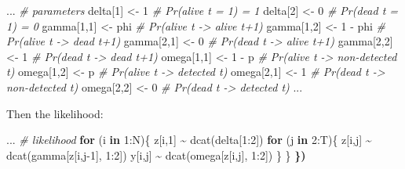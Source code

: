 \documentclass[
  12pt,
]{krantz}
\newenvironment{Shaded}{\begin{snugshade}}{\end{snugshade}}
\newcommand{\CommentTok}[1]{\textcolor[rgb]{0.56,0.35,0.01}{\textit{#1}}}
\newcommand{\ControlFlowTok}[1]{\textcolor[rgb]{0.13,0.29,0.53}{\textbf{#1}}}
\newcommand{\DecValTok}[1]{\textcolor[rgb]{0.00,0.00,0.81}{#1}}
\newcommand{\ErrorTok}[1]{\textcolor[rgb]{0.64,0.00,0.00}{\textbf{#1}}}
\newcommand{\FunctionTok}[1]{\textcolor[rgb]{0.00,0.00,0.00}{#1}}
\newcommand{\NormalTok}[1]{#1}
\newcommand{\OtherTok}[1]{\textcolor[rgb]{0.56,0.35,0.01}{#1}}
\newcommand{\SpecialCharTok}[1]{\textcolor[rgb]{0.00,0.00,0.00}{#1}}
\begin{document}
\begin{Shaded}
\begin{Highlighting}[]
\NormalTok{...}
  \CommentTok{\# parameters}
\NormalTok{  delta[}\DecValTok{1}\NormalTok{] }\OtherTok{\textless{}{-}} \DecValTok{1}          \CommentTok{\# Pr(alive t = 1) = 1}
\NormalTok{  delta[}\DecValTok{2}\NormalTok{] }\OtherTok{\textless{}{-}} \DecValTok{0}          \CommentTok{\# Pr(dead t = 1) = 0}
\NormalTok{  gamma[}\DecValTok{1}\NormalTok{,}\DecValTok{1}\NormalTok{] }\OtherTok{\textless{}{-}}\NormalTok{ phi      }\CommentTok{\# Pr(alive t {-}\textgreater{} alive t+1)}
\NormalTok{  gamma[}\DecValTok{1}\NormalTok{,}\DecValTok{2}\NormalTok{] }\OtherTok{\textless{}{-}} \DecValTok{1} \SpecialCharTok{{-}}\NormalTok{ phi  }\CommentTok{\# Pr(alive t {-}\textgreater{} dead t+1)}
\NormalTok{  gamma[}\DecValTok{2}\NormalTok{,}\DecValTok{1}\NormalTok{] }\OtherTok{\textless{}{-}} \DecValTok{0}        \CommentTok{\# Pr(dead t {-}\textgreater{} alive t+1)}
\NormalTok{  gamma[}\DecValTok{2}\NormalTok{,}\DecValTok{2}\NormalTok{] }\OtherTok{\textless{}{-}} \DecValTok{1}        \CommentTok{\# Pr(dead t {-}\textgreater{} dead t+1)}
\NormalTok{  omega[}\DecValTok{1}\NormalTok{,}\DecValTok{1}\NormalTok{] }\OtherTok{\textless{}{-}} \DecValTok{1} \SpecialCharTok{{-}}\NormalTok{ p    }\CommentTok{\# Pr(alive t {-}\textgreater{} non{-}detected t)}
\NormalTok{  omega[}\DecValTok{1}\NormalTok{,}\DecValTok{2}\NormalTok{] }\OtherTok{\textless{}{-}}\NormalTok{ p        }\CommentTok{\# Pr(alive t {-}\textgreater{} detected t)}
\NormalTok{  omega[}\DecValTok{2}\NormalTok{,}\DecValTok{1}\NormalTok{] }\OtherTok{\textless{}{-}} \DecValTok{1}        \CommentTok{\# Pr(dead t {-}\textgreater{} non{-}detected t)}
\NormalTok{  omega[}\DecValTok{2}\NormalTok{,}\DecValTok{2}\NormalTok{] }\OtherTok{\textless{}{-}} \DecValTok{0}        \CommentTok{\# Pr(dead t {-}\textgreater{} detected t)}
\NormalTok{...}
\end{Highlighting}
\end{Shaded}

Then the likelihood:

\begin{Shaded}
\begin{Highlighting}[]
\NormalTok{...}
    \CommentTok{\# likelihood}
    \ControlFlowTok{for}\NormalTok{ (i }\ControlFlowTok{in} \DecValTok{1}\SpecialCharTok{:}\NormalTok{N)\{}
\NormalTok{    z[i,}\DecValTok{1}\NormalTok{] }\SpecialCharTok{\textasciitilde{}} \FunctionTok{dcat}\NormalTok{(delta[}\DecValTok{1}\SpecialCharTok{:}\DecValTok{2}\NormalTok{])}
    \ControlFlowTok{for}\NormalTok{ (j }\ControlFlowTok{in} \DecValTok{2}\SpecialCharTok{:}\NormalTok{T)\{}
\NormalTok{      z[i,j] }\SpecialCharTok{\textasciitilde{}} \FunctionTok{dcat}\NormalTok{(gamma[z[i,j}\DecValTok{{-}1}\NormalTok{], }\DecValTok{1}\SpecialCharTok{:}\DecValTok{2}\NormalTok{])}
\NormalTok{      y[i,j] }\SpecialCharTok{\textasciitilde{}} \FunctionTok{dcat}\NormalTok{(omega[z[i,j], }\DecValTok{1}\SpecialCharTok{:}\DecValTok{2}\NormalTok{])}
\NormalTok{    \}}
\NormalTok{  \}}
\ErrorTok{\})}
\end{Highlighting}
\end{Shaded}
\end{document}
